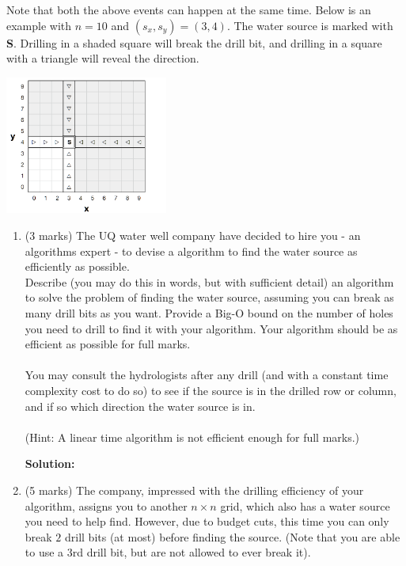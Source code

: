 \documentclass[a4,13pt]{extarticle}
\newenvironment{Solution}{\color{blue}\textbf{Solution:}}{}
\begin{document}
\begin{enumerate}
	      Note that both the above events can happen at the same time. Below is an example with $n=10$ and $(s_x, s_y)=(3, 4)$. 
	      The water source is marked with \textsf{\textbf{S}}. Drilling in a shaded square will break the drill bit, and drilling in 
	      a square with a triangle will reveal the direction.
	      \begin{center}
	      	\includegraphics[width=0.4\textwidth]{a1q4new.png}
	      \end{center}
	      	              
	      \begin{enumerate} 
	      	\item (3 marks) The UQ water well company have decided to hire you - an algorithms expert - to devise a algorithm 
	      	      to find the water source as efficiently as possible. \\
	      	      	      	              
	      	      Describe (you may do this in words, but with sufficient detail) an algorithm to solve the problem of finding the water source, 
	      	      assuming you can break as many drill bits as you want. Provide a Big-O bound on the number of holes you need to drill to find 
	      	      it with your algorithm. Your algorithm should be as efficient as possible for full marks.\\\\
	      	      You may consult the hydrologists after any drill (and with a constant time complexity cost to do so) to see if 
	      	      the source is in the drilled row or column, and if so which direction the water source is in.\\\\
	      	      (Hint: A linear time algorithm is not efficient enough for full marks.)
	      	      
	      	\begin{Solution}
	      	\end{Solution}
	      	      	      	              
	      	\item 
	      	      (5 marks) The company, impressed with the drilling efficiency of your algorithm, assigns you to another $n \times n$ grid, 
	      	      which also has a water source you need to help find. However, due to budget cuts, this time you can only break $2$ drill 
	      	      bits (at most) before finding the source. (Note that you are able to use a $3$rd drill bit, but are not allowed to ever break it).
	      	      	      	              

\end{enumerate}
\end{enumerate}
\end{document}
